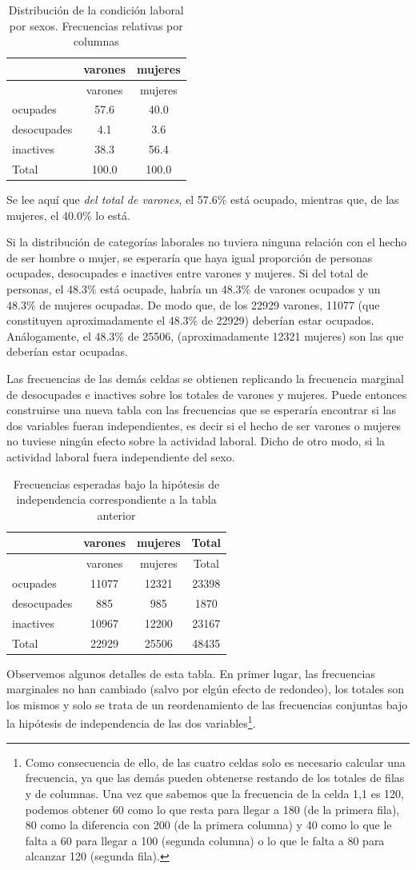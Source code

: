 \documentclass[]{book}
\let\rmarkdownfootnote\footnote%
\def\footnote{\protect\rmarkdownfootnote}
\begin{document}
\begin{longtable}[]{@{}lcc@{}}
\caption{\label{tab:tablaanterior}Distribución de la condición laboral por sexos. Frecuencias relativas por columnas}\tabularnewline
\toprule
& varones & mujeres\tabularnewline
\midrule
\endfirsthead
\toprule
& varones & mujeres\tabularnewline
\midrule
\endhead
ocupades & 57.6 & 40.0\tabularnewline
desocupades & 4.1 & 3.6\tabularnewline
inactives & 38.3 & 56.4\tabularnewline
Total & 100.0 & 100.0\tabularnewline
\bottomrule
\end{longtable}

Se lee aquí que \emph{del total de varones}, el 57.6\% está ocupado, mientras que, de las mujeres, el 40.0\% lo está.

Si la distribución de categorías laborales no tuviera ninguna relación con el hecho de ser hombre o mujer, se esperaría que haya igual proporción de personas ocupades, desocupades e inactives entre varones y mujeres. Si del total de personas, el 48.3\% está ocupade, habría un 48.3\% de varones ocupados y un 48.3\% de mujeres ocupadas. De modo que, de los 22929 varones, 11077 (que constituyen aproximadamente el 48.3\% de 22929) deberían estar ocupados. Análogamente, el 48.3\% de 25506,
(aproximadamente 12321 mujeres) son las que deberían estar ocupadas.

Las frecuencias de las demás celdas se obtienen replicando la frecuencia marginal de desocupades e inactives sobre los totales de varones y mujeres. Puede entonces construirse una nueva tabla con las frecuencias que se esperaría encontrar si las dos variables fueran independientes, es decir si el hecho de ser varones o mujeres no tuviese ningún efecto sobre la actividad laboral. Dicho de otro modo, si la actividad laboral fuera independiente del sexo.

\begin{longtable}[]{@{}lccc@{}}
\caption{\label{tab:unnamed-chunk-123}Frecuencias esperadas bajo la hipótesis de independencia
correspondiente a la tabla anterior}\tabularnewline
\toprule
& varones & mujeres & Total\tabularnewline
\midrule
\endfirsthead
\toprule
& varones & mujeres & Total\tabularnewline
\midrule
\endhead
ocupades & 11077 & 12321 & 23398\tabularnewline
desocupades & 885 & 985 & 1870\tabularnewline
inactives & 10967 & 12200 & 23167\tabularnewline
Total & 22929 & 25506 & 48435\tabularnewline
\bottomrule
\end{longtable}

Observemos algunos detalles de esta tabla. En primer lugar, las frecuencias marginales no han cambiado (salvo por elgún efecto de redondeo), los totales son los mismos y solo se trata de un reordenamiento de las frecuencias conjuntas bajo la hipótesis de independencia de las dos variables\footnote{Como consecuencia de ello, de las cuatro celdas solo es necesario calcular una frecuencia, ya que las demás pueden obtenerse restando de los totales de filas y de columnas. Una vez que sabemos que la frecuencia de la celda 1,1 es 120, podemos obtener 60 como lo que resta para llegar a 180 (de la primera fila), 80 como la diferencia con 200 (de la primera columna) y 40 como lo que le falta a 60 para llegar a 100 (segunda columna) o lo que le falta a 80 para alcanzar 120 (segunda fila).}.
\end{document}
